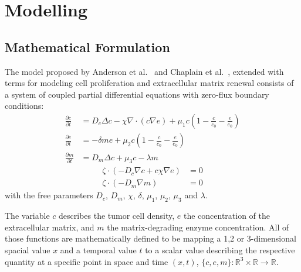 \section{Modelling}

\subsection{Mathematical Formulation}

The model proposed by Anderson et al.~\cite{anderson_continuous_1998,anderson_mathematical_2000} and Chaplain et al.~\cite{anderson_continuous_1998,chaplain_mathematical_2006-1,franssen_mathematical_2019}, extended with terms for modeling cell proliferation and extracellular matrix renewal consists of a system of coupled partial differential equations with zero-flux boundary conditions: 
\begin{align}
	\frac{\partial c}{\partial t} &= D_c \Delta c - \chi \nabla \cdot (c\nabla e)  + \mu_1 c\left(1-\frac{c}{c_0}-\frac{e}{e_0}\right)\label{eq1}\\
	\frac{\partial e}{\partial t} &= -\delta m e  + \mu_2 c\left(1-\frac{c}{c_0}-\frac{e}{e_0}\right)\label{eq2}\\
	\frac{\partial m}{\partial t} &= D_m \Delta c + \mu_3 c - \lambda m\label{eq3}
\end{align}
\begin{align}
	\zeta \cdot  (-D_c \nabla c + c \chi\nabla e) &= 0 \label{eq4}\\
	\zeta \cdot (-D_m\nabla m ) &= 0\label{eq5}
\end{align}
with the free parameters $D_c$, $D_m$, $\chi$, $\delta$, $\mu_1$, $\mu_2$, $\mu_3$ and $\lambda$. 

The variable $c$ describes the tumor cell density, $e$ the concentration of the extracellular matrix, and $m$ the matrix-degrading enzyme concentration. All of those functions are mathematically defined to be mapping a 1,2 or 3-dimensional spacial value $x$ and a temporal value $t$ to a scalar value describing the respective quantity at a specific point in space and time $(x,t)$, $\{c,e,m\}: \mathbb{R}^{3} \times \mathbb{R} \rightarrow \mathbb{R}$.

